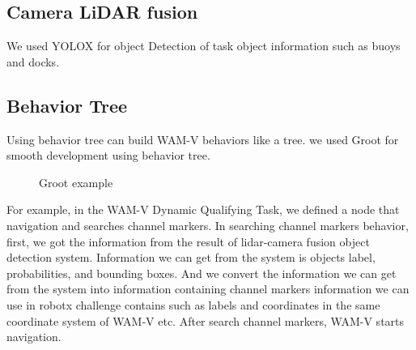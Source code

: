 \documentclass[lettersize,journal]{IEEEtran}
\begin{document}
\subsection{Camera LiDAR fusion}
We used YOLOX\cite{YOLOX} for object Detection of task object information such as buoys and docks.

\subsection{Behavior Tree}
Using behavior tree can build WAM-V behaviors like a tree.  
we used Groot for smooth development using behavior tree.

\begin{figure}[htbp]
  \begin{center}
  \end{center}
  \caption{Groot example}
  \label{fig:Groot}
\end{figure}

For example, in the WAM-V Dynamic Qualifying Task, 
we defined a node that navigation and searches channel markers.
In searching channel markers behavior, first, we got the information from the result of lidar-camera fusion object detection system. 
Information we can get from the system is objects label, probabilities, and bounding boxes.
And we convert the information we can get from the system into information containing channel markers information 
we can use in robotx challenge contains such as labels and coordinates in the same coordinate system of WAM-V etc.
After search channel markers, WAM-V starts navigation.
\end{document}
